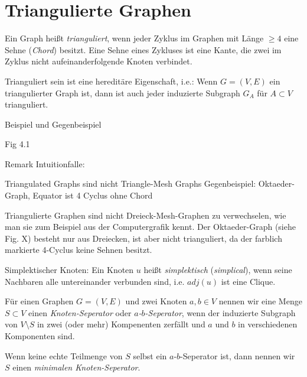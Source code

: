 \documentclass[../main.tex]{subfiles}
\begin{document}
\chapter{Triangulierte Graphen}
\label{chapter:trigulated}

\begin{definition}
    Ein Graph heißt \emph{trianguliert}, wenn jeder Zyklus im Graphen mit Länge $\geq 4$ eine Sehne (\emph{Chord}) besitzt. Eine Sehne eines Zykluses ist eine Kante, die zwei im Zyklus nicht aufeinanderfolgende Knoten verbindet.
\end{definition}

\begin{bemerkung}
    Trianguliert sein ist eine hereditäre Eigenschaft, i.e.: Wenn $G = (V, E)$ ein triangulierter Graph ist, dann ist auch jeder induzierte Subgraph $G_A$ für $A \subset V$ trianguliert.
\end{bemerkung}

Beispiel und Gegenbeispiel

    Fig 4.1

Remark Intuitionfalle:

    Triangulated Graphs sind nicht Triangle-Mesh Graphs
    Gegenbeispiel: Oktaeder-Graph, Equator ist 4 Cyclus ohne Chord

\begin{bemerkung}
    Triangulierte Graphen sind nicht Dreieck-Mesh-Graphen zu verwechselen, wie man sie zum Beispiel aus der Computergrafik kennt. Der Oktaeder-Graph (siehe Fig. X) besteht nur aus Dreiecken, ist aber nicht trianguliert, da der farblich markierte 4-Cyclus keine Sehnen besitzt.
\end{bemerkung}

\begin{definition}
    Simplektischer Knoten: Ein Knoten $u$ heißt \emph{simplektisch} (\emph{simplical}), wenn seine Nachbaren alle untereinander verbunden sind, i.e. $adj(u)$ ist eine Clique.
\end{definition}


\begin{definition}
    Für einen Graphen $G = (V, E)$ und zwei Knoten $a, b \in V$ nennen wir eine Menge $S \subset V$ einen \emph{Knoten-Seperator} oder \emph{$a$-$b$-Seperator}, wenn der induzierte Subgraph von $V \setminus S$ in zwei (oder mehr) Kompenenten zerfällt und $a$ und $b$ in verschiedenen Komponenten sind.
    
    Wenn keine echte Teilmenge von $S$ selbst ein $a$-$b$-Seperator ist, dann nennen wir $S$ einen \emph{minimalen Knoten-Seperator}.
\end{definition}
\end{document}
